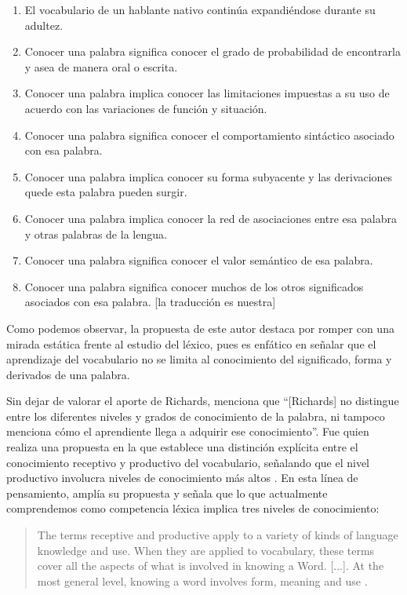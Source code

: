 \documentclass{textolivre}
\begin{document}
\begin{enumerate}
\item El vocabulario de un hablante nativo continúa expandiéndose durante su adultez.
\item Conocer una palabra significa conocer el grado de probabilidad de encontrarla y asea de manera oral o escrita.
\item Conocer una palabra implica conocer las limitaciones impuestas a su uso de acuerdo con las variaciones de función y situación.
\item Conocer una palabra significa conocer el comportamiento sintáctico asociado con esa palabra.
\item Conocer una palabra implica conocer su forma subyacente y las derivaciones quede esta palabra pueden surgir.
\item Conocer una  palabra implica conocer la red de  asociaciones entre  esa  palabra  y otras palabras de la lengua.
\item Conocer una palabra significa conocer el valor semántico de esa palabra.
\item Conocer una palabra significa conocer muchos de los otros significados asociados con esa palabra. [la traducción es nuestra]
\end{enumerate}

Como podemos observar, la propuesta de este autor destaca por romper con
una mirada estática frente al estudio del léxico, pues es enfático en señalar
que el aprendizaje del vocabulario no se limita al conocimiento del significado,
forma y derivados de una palabra.

Sin dejar de valorar el aporte de Richards, \textcite[p. 15]{arancibia} menciona
que “[Richards] no distingue entre los diferentes niveles y grados de
conocimiento de la palabra, ni tampoco menciona cómo el aprendiente llega a
adquirir ese conocimiento”. Fue \textcite{natio1990} quien realiza una propuesta en la
que establece una distinción explícita entre el conocimiento receptivo y
productivo del vocabulario, señalando que el nivel productivo involucra niveles
de conocimiento más altos \cite{Choudhury2015}. En esta línea de pensamiento,
\textcite{natio2001} amplía su propuesta y señala que lo que actualmente comprendemos
como competencia léxica implica tres niveles de conocimiento:

\begin{quote}
The terms receptive and productive apply to a variety of kinds of
language knowledge and use. When they are applied to vocabulary, these terms
cover all the aspects of what is involved in knowing a Word. [...]. At the most
general level, knowing a word involves form, meaning and use \cite[p. 40]{natio2001}.
\end{quote}
\end{document}
